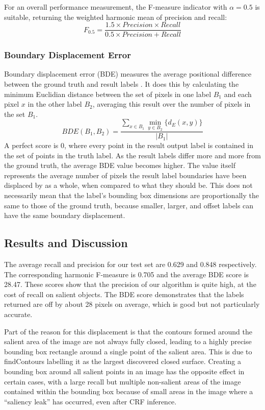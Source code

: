 \documentclass[10pt,twocolumn,letterpaper]{article}
\newcommand{\SUM}{\sum\limits}
\begin{document}
For an overall performance measurement, the F-measure indicator with $\alpha = 0.5$ is suitable, returning the weighted harmonic mean of precision and recall:$$F_{0.5} = \frac{1.5\times Precision \times Recall}{ 0.5 \times Precision + Recall}$$

\subsubsection{Boundary Displacement Error}
Boundary displacement error (BDE) measures the average positional difference between the ground truth and result labels \cite{bde}.  It does this by calculating the minimum Euclidian distance between the set of pixels in one label $B_1$ and each pixel $x$ in the other label $B_2$, averaging this result over the number of pixels in the set $B_1$. $$BDE(B_1,B_2)=\frac{\SUM_{x\in B_1}\min\limits_{y\in B_2}\{d_E(x,y)\}}{|B_1|}$$  A perfect score is 0, where every point in the result output label is contained in the set of points in the truth label.  As the result labels differ more and more from the ground truth, the average BDE value becomes higher.  The value itself represents the average number of pixels the result label boundaries have been displaced by as a whole, when compared to what they should be.  This does not necessarily mean that the label's bounding box dimensions are proportionally the same to those of the ground truth, because smaller, larger, and offset labels can have the same boundary displacement. 

\subsection{Results and Discussion}

The average recall and precision for our test set are 0.629 and 0.848 respectively.  The corresponding harmonic F-measure is 0.705 and the average BDE score is 28.47.  These scores show that the precision of our algorithm is quite high, at the cost of recall on salient objects.  The BDE score demonstrates that the labels returned are off by about 28 pixels on average, which is good but not particularly accurate.

Part of the reason for this displacement is that the contours formed around the salient area of the image are not always fully closed, leading to a highly precise bounding box rectangle around a single point of the salient area.  This is due to findContours labelling it as the largest discovered closed surface.  Creating a bounding box around all salient points in an image has the opposite effect in certain cases, with a large recall but multiple non-salient areas of the image contained within the bounding box because of small areas in the image where a ``saliency leak'' has occurred, even after CRF  inference.
\end{document}
